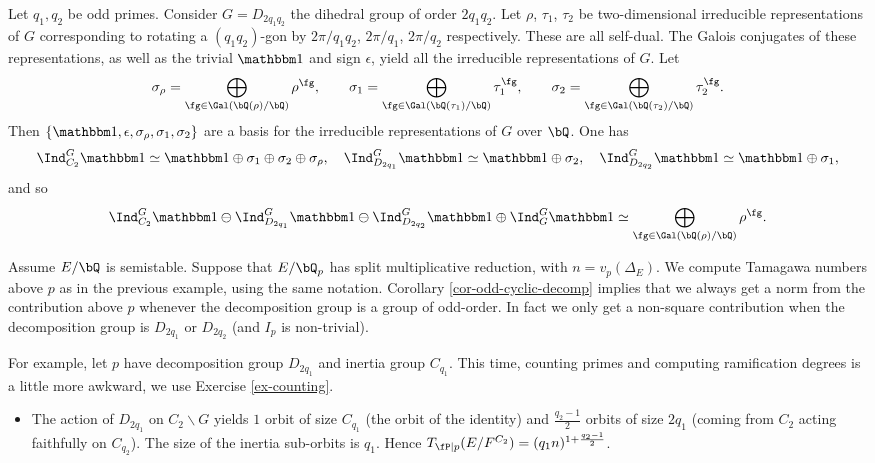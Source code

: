 \begin{example}[Dihedral]
    Let $q_1, q_2$ be odd primes. Consider $G = D_{2 q_1 q_2}$ the dihedral group of order $2 q_1 q_2$. 
    Let $\rho$, $\tau_1$, $\tau_2$ be two-dimensional irreducible representations of $G$ corresponding to rotating a $(q_1 q_2)$-gon by $2 \pi / q_1 q_2$, $2 \pi / q_1$, $2 \pi/ q_2$ respectively. These are all self-dual. The Galois conjugates of these representations, as well as the trivial $\trivial$ and sign $\epsilon$, yield all the irreducible representations of $G$. Let 
    \[  \sigma_{\rho} = \bigoplus_{ \fg \in \Gal(\bQ(\rho) / \bQ)} \rho^{\fg}, \qquad
        \sigma_1 = \bigoplus_{ \fg \in \Gal(\bQ(\tau_1) / \bQ)} \tau_1^{\fg}, \qquad
        \sigma_2 = \bigoplus_{ \fg \in \Gal(\bQ(\tau_2) / \bQ)} \tau_2^{\fg}. \]  
    Then $ \{ \trivial , \epsilon, \sigma_{\rho}, \sigma_1, \sigma_2 \}$ are a basis for the irreducible representations of $G$ over $\bQ$. 
    One has
\[
        \Ind_{C_2}^G \trivial \simeq \trivial \oplus \sigma_1 \oplus \sigma_2 \oplus \sigma_{\rho}, \quad
        \Ind_{D_{2 q_1}}^G \trivial \simeq \trivial \oplus \sigma_2, \quad
        \Ind_{D_{2 q_2}}^G \trivial \simeq \trivial \oplus \sigma_1,
\]
and so 
\begin{equation*}
\Ind_{C_2}^G \trivial \ominus \Ind_{D_{2 q_1}}^G \trivial \ominus \Ind_{D_{2 q_2}}^G \trivial \oplus \Ind_{G}^G \trivial \simeq \bigoplus_{ \fg \in \Gal(\bQ(\rho) / \bQ)} \rho^{\fg}.
\end{equation*}

    Assume $E / \bQ$ is semistable. Suppose that $E / \bQ_p$ has split multiplicative reduction, with $n = v_p(\Delta_E)$. We compute Tamagawa numbers above $p$ as in the previous example, using the same notation. 
    Corollary \ref{cor-odd-cyclic-decomp} implies that we always get a norm from the contribution above $p$ whenever the decomposition group is a group of odd-order. In fact we only get a non-square contribution when the decomposition group is $D_{2 q_1}$ or $D_{2 q_2}$ (and $I_p$ is non-trivial). 
     
    For example, let $p$ have decomposition group $D_{2 q_1}$ and inertia group $C_{q_1}$.
    This time, counting primes and computing ramification degrees is a little more awkward, we use Exercise \ref{ex-counting}.
        \begin{itemize}[--]
            \setlength\itemsep{0em}
            \item The action of $D_{2 q_1}$ on $C_2 \backslash G$ yields $1$ orbit of size $C_{q_1}$ (the orbit of the identity) and $\frac{q_2 - 1}{2}$ orbits of size $2q_1$ (coming from $C_2$ acting faithfully on $C_{q_2}$). The size of the inertia sub-orbits is $q_1$. Hence $T_{\fP \mid p}(E / F^{C_2}) = (q_1 n)^{1 + \frac{q_2 - 1}{2}}$.
            

\end{itemize}
\end{example}
